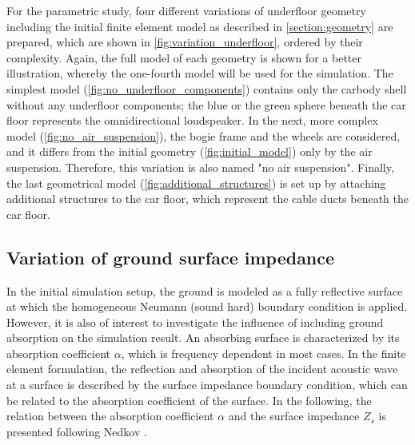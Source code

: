 {For the parametric study, four different variations of underfloor geometry including the initial finite element model as described in \cref{section:geometry} are prepared, which are shown in \cref{fig:variation_underfloor}, ordered by their complexity. Again, the full model of each geometry is shown for a better illustration, whereby the one-fourth model will be used for the simulation. The simplest model (\cref{fig:no_underfloor_components}) contains only the carbody shell without any underfloor components; the blue or the green sphere beneath the car floor represents the omnidirectional loudspeaker. In the next, more complex model (\cref{fig:no_air_suspension}), the bogie frame and the wheels are considered, and it differs from the initial geometry (\cref{fig:initial_model}) only by the air suspension. Therefore, this variation is also named "no air suspension". Finally, the last geometrical model (\cref{fig:additional_structures}) is set up by attaching additional structures to the car floor, which represent the cable ducts beneath the car floor.

\newpage
\subsection{Variation of ground surface impedance}

In the initial simulation setup, the ground is modeled as a fully reflective surface at which the homogeneous Neumann (sound hard) boundary condition is applied.
However, it is also of interest to investigate the influence of including ground absorption on the simulation result.
An absorbing surface is characterized by its absorption coefficient $\alpha$, which is frequency dependent in most cases.
In the finite element formulation, the reflection and absorption of the incident acoustic wave at a surface is described by the surface impedance boundary condition, which can be related to the absorption coefficient of the surface. In the following, the relation between the absorption coefficient $\alpha$ and the surface impedance $Z_s$ is presented following Nedkov \cite{nedkov_impedance_2011}.

}
